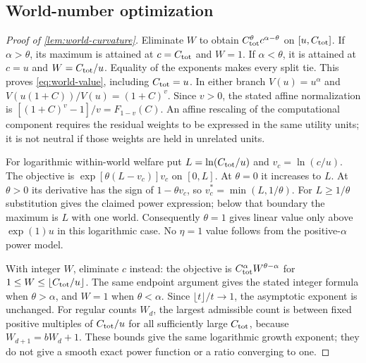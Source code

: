 \documentclass[11pt,a4paper]{article}
\theoremstyle{definition}\newtheorem{definition}{Definition}
\begin{document}
\subsection{World-number optimization}
\label{app:world-proof}
\begin{proof}[Proof of \cref{lem:world-curvature}]
Eliminate $W$ to obtain $C_{\rm tot}^{\theta}c^{\alpha-\theta}$ on
$[u,C_{\rm tot}]$. If $\alpha>\theta$, its maximum is attained at
$c=C_{\rm tot}$ and $W=1$. If $\alpha<\theta$, it is attained at
$c=u$ and $W=C_{\rm tot}/u$. Equality of the exponents makes every
split tie. This proves \cref{eq:world-value}, including $C_{\rm tot}=u$.
In either branch $V(u)=u^\alpha$ and
$V(u(1+C))/V(u)=(1+C)^v$. Since $v>0$, the stated affine
normalization is $[(1+C)^v-1]/v=F_{1-v}(C)$.
An affine rescaling of the computational component requires the residual
weights to be expressed in the same utility units; it is not neutral if
those weights are held in unrelated units.

For logarithmic within-world welfare put $L=\ln(C_{\rm tot}/u)$ and
$v_c=\ln(c/u)$. The objective is $\exp[\theta(L-v_c)]v_c$ on $[0,L]$.
At $\theta=0$ it increases to $L$. At $\theta>0$ its derivative has the
sign of $1-\theta v_c$, so $v_c^*=\min(L,1/\theta)$. For
$L\geq1/\theta$ substitution gives the claimed power expression;
below that boundary the maximum is $L$ with one world. Consequently
$\theta=1$ gives linear value only above $\exp(1)u$ in this logarithmic
case. No $\eta=1$ value follows from the positive-$\alpha$ power model.

With integer $W$, eliminate $c$ instead: the objective is
$C_{\rm tot}^\alpha W^{\theta-\alpha}$ for
$1\leq W\leq\lfloor C_{\rm tot}/u\rfloor$. The same endpoint argument
gives the stated integer formula when $\theta>\alpha$, and $W=1$
when $\theta<\alpha$. Since $\lfloor t\rfloor/t\to1$, the asymptotic
exponent is unchanged. For regular counts $W_d$, the largest admissible
count is between fixed positive multiples of $C_{\rm tot}/u$ for all
sufficiently large $C_{\rm tot}$, because $W_{d+1}=bW_d+1$.
These bounds give the same logarithmic growth exponent; they do not
give a smooth exact power function or a ratio converging to one.
\end{proof}
\end{document}
